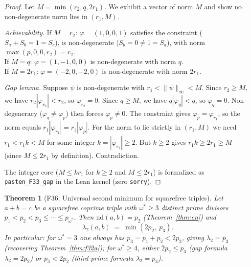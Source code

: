 \documentclass[12pt]{article}
\newtheorem{theorem}{Theorem}
\theoremstyle{definition}
\begin{document}
\begin{proof}
  Let $M = \min(r_2, q, 2r_1)$.  We exhibit a vector of norm $M$ and show no
  non-degenerate norm lies in $(r_1, M)$.

  \textit{Achievability.}
  If $M = r_2$: $\varphi = (1,0,0,1)$ satisfies the constraint ($S_a+S_b = 1 = S_c$),
  is non-degenerate ($S_b=0 \ne 1=S_a$), with norm $\max(p,0,0,r_2) = r_2$. \\
  If $M = q$: $\varphi = (1,-1,0,0)$ is non-degenerate with norm $q$. \\
  If $M = 2r_1$: $\varphi = (-2,0,-2,0)$ is non-degenerate with norm $2r_1$.

  \textit{Gap lemma.}  Suppose $\psi$ is non-degenerate with
  $r_1 < \|\psi\|_\infty < M$.
  Since $r_2 \ge M$, we have $r_2 |\varphi_{r_2}| < r_2$, so $\varphi_{r_2}=0$.
  Since $q \ge M$, we have $q|\varphi_q| < q$, so $\varphi_q=0$.
  Non-degeneracy ($\varphi_q \ne \varphi_p$) then forces $\varphi_p \ne 0$.
  The constraint gives $\varphi_p = \varphi_{r_1}$, so the norm equals
  $r_1 |\varphi_{r_1}| = r_1 |\varphi_p|$.
  For the norm to lie strictly in $(r_1, M)$ we need $r_1 < r_1 k < M$ for some
  integer $k = |\varphi_{r_1}| \ge 2$.  But $k \ge 2$ gives $r_1 k \ge 2r_1 \ge M$
  (since $M \le 2r_1$ by definition).  Contradiction.

  The integer core ($M \le k r_1$ for $k \ge 2$ and $M \le 2r_1$) is formalized
  as \texttt{pasten\_F33\_gap} in the Lean kernel (zero \texttt{sorry}).
\end{proof}

\begin{theorem}[F36: Universal second minimum for squarefree triples]\label{thm:f36}
  Let $a + b = c$ be a squarefree coprime triple with $\omega^* \ge 3$ distinct
  prime divisors $p_1 < p_2 < p_3 \le \cdots \le p_{\omega^*}$.
  Then $\mathrm{nd}(a,b) = p_2$ (Theorem~\ref{thm:en}) and
  \[
    \lambda_2(a,b) \;=\; \min(2p_2,\; p_3).
  \]
  In particular: for $\omega^*=3$ one always has $p_3 = p_1+p_2 < 2p_2$, giving
  $\lambda_2 = p_3$ (recovering Theorem~\ref{thm:f32a}); for $\omega^*\ge 4$,
  either $2p_2 \le p_3$ (gap formula $\lambda_2 = 2p_2$) or $p_3 < 2p_2$
  (third-prime formula $\lambda_2 = p_3$).
\end{theorem}
\end{document}
